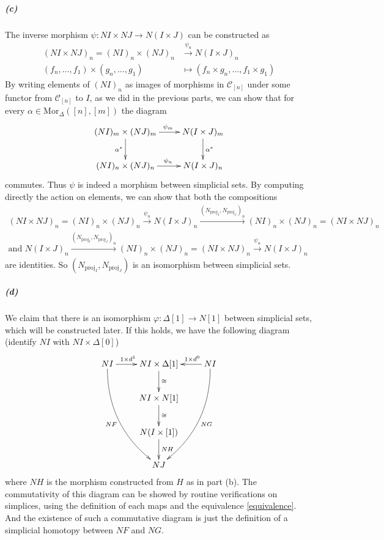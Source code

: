 \documentclass{article}
\begin{document}
\subparagraph{(c)}The inverse morphism $\psi\colon NI\times NJ \rightarrow N(I\times J)$ can be constructed as
\begin{align*}
  (NI\times NJ)_n=(NI)_n\times(NJ)_n & \xrightarrow{\psi_n} N(I\times J)_n \\
  (f_n,\ldots,f_1)\times(g_n,\ldots,g_1) & \mapsto (f_n\times g_n,\ldots,f_1\times g_1)
\end{align*}
By writing elements of $(NI)_n$ as images of morphisms in $\mathcal{C}_{[n]}$ under some functor from $\mathcal{C}_{[n]}$ to $I$, as we did in the previous parts, we can show that for every $\alpha\in\text{Mor}_{\Delta}([n],[m])$ the diagram
\[\xymatrix{(NI)_m\times(NJ)_m\ar[r]^(.55){\psi_m}\ar[d]_{\alpha^*} & N(I\times J)_m\ar[d]^{\alpha^*} \\
(NI)_n\times(NJ)_n\ar[r]^(.55){\psi_n} & N(I\times J)_n}\]
commutes. Thus $\psi$ is indeed a morphism between simplicial sets. By computing directly the action on elements, we can show that both the compositions
\begin{gather*}
  (NI\times NJ)_n=(NI)_n\times(NJ)_n \xrightarrow{\psi_n} N(I\times J)_n\xrightarrow{(N_{{\text{proj}}_I},N_{{\text{proj}}_J})_n}(NI)_n\times(NJ)_n=(NI\times NJ)_n \\
  \text{and }N(I\times J)_n\xrightarrow{(N_{{\text{proj}}_I},N_{{\text{proj}}_J})_n}(NI)_n\times(NJ)_n=(NI\times NJ)_n\xrightarrow{\psi_n} N(I\times J)_n
\end{gather*}
are identities. So $(N_{{\text{proj}}_I},N_{{\text{proj}}_J})$ is an isomorphism between simplicial sets.

\subparagraph{(d)}We claim that there is an isomorphism $\varphi\colon\Delta[1]\rightarrow N[1]$ between simplicial sets, which will be constructed later. If this holds, we have the following diagram (identify $NI$ with $NI\times\Delta[0]$)
\[\xymatrix{NI\ar[r]^(.4){1\times d^1}\ar@/_1.5pc/[dddr]_{NF} & NI\times\Delta[1]\ar[d]^{\cong} & NI\ar[l]_(.35){1\times d^0}\ar@/^1.5pc/[dddl]^{NG} \\
 & NI\times N[1]\ar[d]^{\cong} & \\
 & N(I\times[1])\ar[d]^{NH} & \\
 & NJ & }\]
where $NH$ is the morphism constructed from $H$ as in part (b). The commutativity of this diagram can be showed by routine verifications on simplices, using the definition of each maps and the equivalence \eqref{equivalence}. And the existence of such a commutative diagram is just the definition of a simplicial homotopy between $NF$ and $NG.$
 
\end{document}
